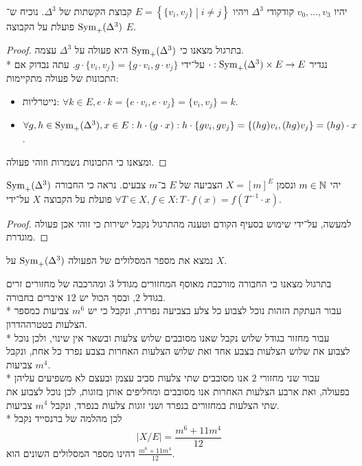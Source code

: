 \Question{}
\Subquestion{}
יהיו $v_0, \dots, v_3$ קודקודי $\Delta^3$ ויהיו $E = \left\{ \{v_i, v_j\} \middle| i \ne j \right\}$ קבוצת הקשתות של $\Delta^3$.
נוכיח ש־$\operatorname{Sym}_+(\Delta^3)$ פועלת על הקבוצה $E$. 
\begin{proof}
	בתרגול מצאנו כי $\operatorname{Sym}_+(\Delta^3)$ היא פעולה על $\Delta^3$ עצמה. \\*
	נגדיר $\cdot : \operatorname{Sym}_+(\Delta^3) \times E \to E$ על־ידי $g \cdot \{v_i, v_j\} = \{g \cdot v_i, g \cdot v_j\}$.
	עתה נבדוק אם התכונות של פעולה מתקיימות:
	\begin{itemize}
		\item נייטרליות: $\forall k \in E, e \cdot k = \{ e \cdot v_i, e \cdot v_j \} = \{v_i, v_j \} = k$.
		\item $\forall g, h \in \operatorname{Sym}_+(\Delta^3), x \in E: h \cdot (g \cdot x): h \cdot \{g v_i, g v_j \} = \{ (hg) v_i, (hg)v_j\} = (hg) \cdot x$.
	\end{itemize}
	ומצאנו כי התכונות נשמרות וזוהי פעולה.
\end{proof}

\Subquestion{}
יהי $m \in \mathbb{N}$ ונסמן $X = {[m]}^E$ הצביעה של $E$ ב־$m$ צבעים.
נראה כי החבורה $\operatorname{Sym}_+(\Delta^3)$ פועלת על הקבוצה $X$ על־ידי $\forall T \in X, f \in X : T \cdot f(x) = f(T^{-1} \cdot x)$.
\begin{proof}
	למעשה, על־ידי שימוש בסעיף הקודם וטענה מהתרגול נקבל ישירות כי זוהי אכן פעולה מוגדרת.
\end{proof}

\Subquestion{}
נמצא את מספר המסלולים של הפעולה $\operatorname{Sym}_+(\Delta^3)$ על $X$.

בתרגול מצאנו כי החבורה מורכבת מאוסף המחזורים מגודל $3$ ומהרכבה של מחזורים זרים בגודל $2$, ובסך הכול יש $12$ איברים בחבורה.\\*
עבור העתקת הזהות נוכל לצבוע כל צלע בצביעה נפרדת, ונקבל כי יש $m^6$ צביעות כמספר הצלעות בטטרההדרון. \\*
עבור מחזור בגודל שלוש נקבל שאנו מסובבים שלוש צלעות ובשאר אין שינוי, ולכן נוכל לצבוע את שלוש הצלעות בצבע אחד ואת שלוש הצלעות האחרות בצבע נפרד כל אחת, ונקבל $m^4$ צביעות. \\*
עבור שני מחזורי $2$ אנו מסובבים שתי צלעות סביב עצמן ובעצם לא משפיעים עליהן בפעולה, ואת ארבע הצלעות האחרות אנו מסובבים ומחליפים אותן בזוגות, לכן נוכל לצבוע את שתי הצלעות במחזורים בנפרד ושני זוגות צלעות בנפרד, ונקבל $m^4$ צביעות. \\*
לכן מהלמה של ברנסייד נקבל
\[
	|X/E| = \frac{m^6 + 11m^4}{12}
\]
דהינו מספר המסלולים השונים הוא $\frac{m^6 + 11m^4}{12}$.

